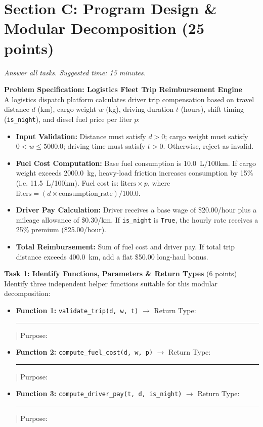 \documentclass[11pt,a4paper]{article}
\begin{document}
\newpage


\section*{Section C: Program Design \& Modular Decomposition \hfill \normalsize\normalfont(25 points)}
\textit{Answer all tasks. Suggested time: 15 minutes.}

\begin{tcolorbox}[colback=boxbg,colframe=secondaryteal,arc=1.5mm,boxrule=0.6pt,top=1.5mm,bottom=1.5mm]
\textbf{Problem Specification: Logistics Fleet Trip Reimbursement Engine}\\[0.5mm]
\small
A logistics dispatch platform calculates driver trip compensation based on travel distance $d$ (km), cargo weight $w$ (kg), driving duration $t$ (hours), shift timing (\texttt{is\_night}), and diesel fuel price per liter $p$:
\begin{itemize}[itemsep=0.5pt,topsep=0.5pt]
  \item \textbf{Input Validation:} Distance must satisfy $d > 0$; cargo weight must satisfy $0 < w \le 5000.0$; driving time must satisfy $t > 0$. Otherwise, reject as invalid.
  \item \textbf{Fuel Cost Computation:} Base fuel consumption is 10.0~L/100km. If cargo weight exceeds 2000.0~kg, heavy-load friction increases consumption by 15\% (i.e. 11.5~L/100km). Fuel cost is: $\text{liters} \times p$, where $\text{liters} = (d \times \text{consumption\_rate}) / 100.0$.
  \item \textbf{Driver Pay Calculation:} Driver receives a base wage of \$20.00/hour plus a mileage allowance of \$0.30/km. If \texttt{is\_night} is \texttt{True}, the hourly rate receives a 25\% premium (\$25.00/hour).
  \item \textbf{Total Reimbursement:} Sum of fuel cost and driver pay. If total trip distance exceeds 400.0~km, add a flat \$50.00 long-haul bonus.
\end{itemize}
\end{tcolorbox}

\vspace{0.5mm}
\textbf{Task 1: Identify Functions, Parameters \& Return Types} (6 points)
Identify three independent helper functions suitable for this modular decomposition:
\begin{itemize}[leftmargin=1.8em,itemsep=2.5pt]
  \item \textbf{Function 1:} \texttt{validate\_trip(d, w, t)} $\rightarrow$ Return Type: \rule{2.2cm}{0.4pt} | Purpose: \dotfill
  \item \textbf{Function 2:} \texttt{compute\_fuel\_cost(d, w, p)} $\rightarrow$ Return Type: \rule{2.2cm}{0.4pt} | Purpose: \dotfill
  \item \textbf{Function 3:} \texttt{compute\_driver\_pay(t, d, is\_night)} $\rightarrow$ Return Type: \rule{2.2cm}{0.4pt} | Purpose: \dotfill
\end{itemize}
\end{document}

